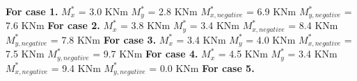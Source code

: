 \documentclass{article}%
\begin{document}
%
\textbf{For case 1.\newline%
\newline%
}%
$M_{x}^{*}$ = 3.0 KNm%
\newline%
\newline%
%
$M_{y}^{*}$ = 2.8 KNm%
\newline%
\newline%
%
$M_{x,negative}^{*}$ = 6.9 KNm%
\newline%
\newline%
%
$M_{y,negative}^{*}$ = 7.6 KNm%
\newline%
\newline%
%
\textbf{For case 2.\newline%
\newline%
}%
$M_{x}^{*}$ = 3.8 KNm%
\newline%
\newline%
%
$M_{y}^{*}$ = 3.4 KNm%
\newline%
\newline%
%
$M_{x,negative}^{*}$ = 8.4 KNm%
\newline%
\newline%
%
$M_{y,negative}^{*}$ = 7.8 KNm%
\newline%
\newline%
%
\textbf{For case 3.\newline%
\newline%
}%
$M_{x}^{*}$ = 3.4 KNm%
\newline%
\newline%
%
$M_{y}^{*}$ = 4.0 KNm%
\newline%
\newline%
%
$M_{x,negative}^{*}$ = 7.5 KNm%
\newline%
\newline%
%
$M_{y,negative}^{*}$ = 9.7 KNm%
\newline%
\newline%
%
\textbf{For case 4.\newline%
\newline%
}%
$M_{x}^{*}$ = 4.5 KNm%
\newline%
\newline%
%
$M_{y}^{*}$ = 3.4 KNm%
\newline%
\newline%
%
$M_{x,negative}^{*}$ = 9.4 KNm%
\newline%
\newline%
%
$M_{y,negative}^{*}$ = 0.0 KNm%
\newline%
\newline%
%
\textbf{For case 5.\newline%
\newline%
}%
\end{document}
